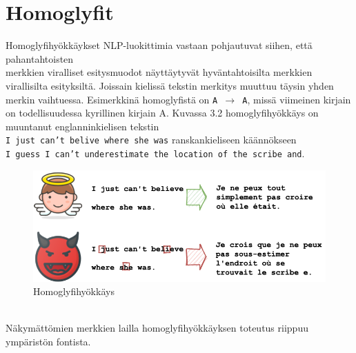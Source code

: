 \section{Homoglyfit}
Homoglyfihyökkäykset NLP-luokittimia vastaan pohjautuvat siihen, että pahantahtoisten\\ merkkien viralliset esitysmuodot näyttäytyvät hyväntahtoisilta merkkien virallisilta esityksiltä. Jois\-sain kielissä tekstin merkitys muuttuu täysin yhden merkin vaihtuessa. Esimerkkinä homoglyfistä on \texttt{A $\rightarrow$ A}, missä viimeinen kirjain on todellisuudessa kyrillinen kirjain A. Kuvassa 3.2 homoglyfihyökkäys on muuntanut englanninkielisen tekstin\\ \texttt{I just can't belive where she was} ranskankieliseen käännökseen\\ \texttt{I guess I can't underestimate the location of the scribe and}.
\begin{figure}[hbt]
  \includegraphics[scale=0.599]{figures/homoglyph.png}
  \caption{Homoglyfihyökkäys \citep{boucher2021bad}}
\end{figure}
\\Näkymättömien merkkien lailla homoglyfihyökkäyksen toteutus riippuu ympäristön fontista. \citep{boucher2021bad}

